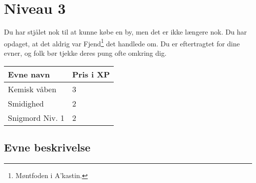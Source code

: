 \chapter{Niveau 3}
Du har stjålet nok til at kunne købe en by, men det er ikke længere nok. Du har opdaget, at det aldrig var Fjend\footnote{Møntfoden i A'kastin.} det handlede om. Du er eftertragtet for dine evner, og folk bør tjekke deres pung ofte omkring dig. 
\begin{table}[H]
    \centering
    \begin{tabular}{|p{}|p{}|}
    \rowcolor{cerulean!80}\hline
        Evne navn & Pris i XP \\\hline
        Kemisk våben & 3\\\hline
        Smidighed & 2\\\hline
        Snigmord Niv. 1 & 2\\
         \hline
    \end{tabular}
\end{table}
\section{Evne beskrivelse}






